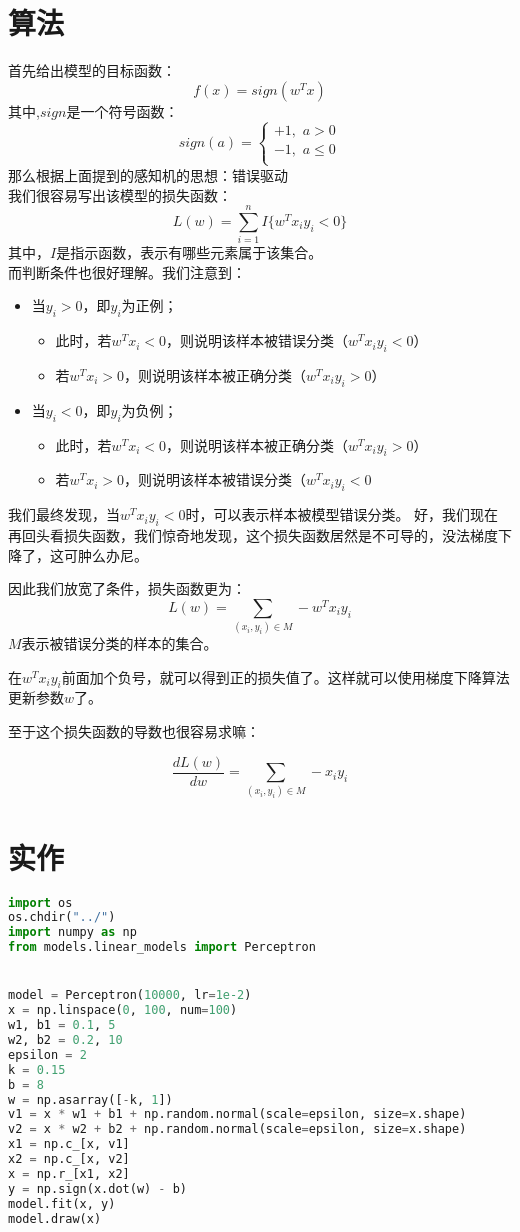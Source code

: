 \documentclass{report}
\begin{document}
\section{算法}
首先给出模型的目标函数：
$$
f(x)=sign(w^Tx)
$$
其中,$sign$是一个符号函数：
$$
sign(a)=
\begin{cases}
+1,\,\,a>0\\
-1,\,\,a\le0\\
\end{cases}
$$
那么根据上面提到的感知机的思想：错误驱动\\
我们很容易写出该模型的损失函数：
$$
L(w)=\sum_{i=1}^n I\{w^Tx_i  y_i<0 \}
$$
其中，$I$是指示函数，表示有哪些元素属于该集合。\\
而判断条件也很好理解。我们注意到：
\begin{itemize}
	\item 当$y_i>0$，即$y_i$为正例；
	\begin{itemize}
	\item 此时，若$w^Tx_i<0$，则说明该样本被错误分类（$w^Tx_i y_i<0$）
	\item 若$w^Tx_i>0$，则说明该样本被正确分类（$w^Tx_i y_i>0$）
	\end{itemize}
	\item 当$y_i<0$，即$y_i$为负例；
	\begin{itemize}
	\item 此时，若$w^Tx_i<0$，则说明该样本被正确分类（$w^Tx_i y_i>0$）
	\item 若$w^Tx_i>0$，则说明该样本被错误分类（$w^Tx_i y_i<0$
	\end{itemize}
\end{itemize}
我们最终发现，当$w^Tx_i  y_i<0$时，可以表示样本被模型错误分类。
好，我们现在再回头看损失函数，我们惊奇地发现，这个损失函数居然是不可导的，没法梯度下降了，这可肿么办尼。

因此我们放宽了条件，损失函数更为：
$$
L(w)=\sum_{(x_i,y_i)\in M} -w^Tx_i y_i
$$
$M$表示被错误分类的样本的集合。

在$w^Tx_i y_i$前面加个负号，就可以得到正的损失值了。这样就可以使用梯度下降算法更新参数$w$了。

至于这个损失函数的导数也很容易求嘛：

$$
\frac{dL(w)}{dw}=\sum_{(x_i,y_i)\in M} -x_i y_i
$$
\newpage
\section{实作}
\begin{lstlisting}[language={python}]
import os
os.chdir("../")
import numpy as np
from models.linear_models import Perceptron


model = Perceptron(10000, lr=1e-2)
x = np.linspace(0, 100, num=100)
w1, b1 = 0.1, 5
w2, b2 = 0.2, 10
epsilon = 2
k = 0.15
b = 8
w = np.asarray([-k, 1])
v1 = x * w1 + b1 + np.random.normal(scale=epsilon, size=x.shape)
v2 = x * w2 + b2 + np.random.normal(scale=epsilon, size=x.shape)
x1 = np.c_[x, v1]
x2 = np.c_[x, v2]
x = np.r_[x1, x2]
y = np.sign(x.dot(w) - b)
model.fit(x, y)
model.draw(x)
\end{lstlisting}
\end{document}
